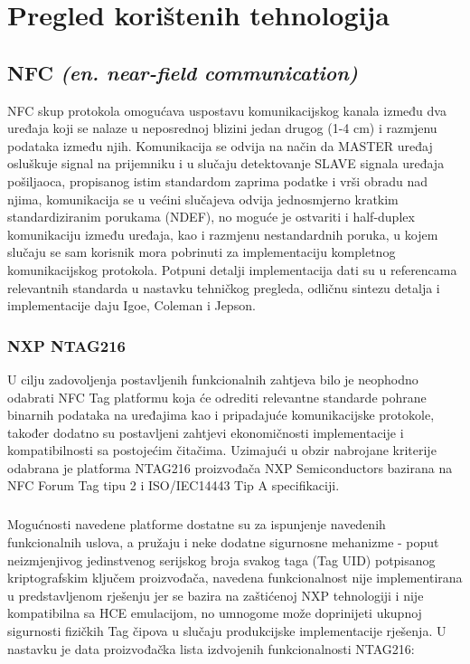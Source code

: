\chapter{Pregled korištenih tehnologija}

\section{NFC \textit{(en. near-field communication)}}
NFC skup protokola omogućava uspostavu komunikacijskog kanala između dva uređaja koji se nalaze u neposrednoj blizini jedan drugog (1-4 cm) i razmjenu podataka između njih\cite{NFCProtocol}. Komunikacija se odvija na način da MASTER uređaj osluškuje signal na prijemniku i u slučaju detektovanje SLAVE signala uređaja pošiljaoca, propisanog istim standardom zaprima podatke i vrši obradu nad njima, komunikacija se u većini slučajeva odvija jednosmjerno kratkim standardiziranim porukama (NDEF), no moguće je ostvariti i half-duplex komunikaciju između uređaja, kao i razmjenu nestandardnih poruka, u kojem slučaju se sam korisnik mora pobrinuti za implementaciju kompletnog komunikacijskog protokola. Potpuni detalji implementacija dati su u referencama relevantnih standarda u nastavku tehničkog pregleda, odličnu sintezu detalja i implementacije daju Igoe, Coleman i Jepson\cite{Igoe2014}.
\subsection{NXP NTAG216}
U cilju zadovoljenja postavljenih funkcionalnih zahtjeva bilo je neophodno odabrati NFC Tag platformu koja će odrediti relevantne standarde pohrane binarnih podataka na uređajima kao i pripadajuće komunikacijske protokole, također dodatno su postavljeni zahtjevi ekonomičnosti implementacije i kompatibilnosti sa postojećim čitačima. Uzimajući u obzir nabrojane kriterije odabrana je platforma NTAG216 proizvođača NXP Semiconductors\cite{NTAG216} bazirana na NFC Forum Tag tipu 2 i ISO/IEC14443 Tip A specifikaciji\cite{NFCTag2}\cite{ISO14443}. 

\paragraph*{}
Mogućnosti navedene platforme dostatne su za ispunjenje navedenih funkcionalnih uslova, a pružaju i neke dodatne sigurnosne mehanizme - poput neizmjenjivog jedinstvenog serijskog broja svakog taga (Tag UID) potpisanog kriptografskim ključem proizvođača, navedena funkcionalnost nije implementirana u predstavljenom rješenju jer se bazira na zaštićenoj NXP tehnologiji i nije kompatibilna sa HCE emulacijom, no umnogome može doprinijeti ukupnoj sigurnosti fizičkih Tag čipova u slučaju produkcijske implementacije rješenja. U nastavku je data proizvođačka lista izdvojenih funkcionalnosti NTAG216:

